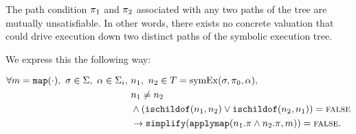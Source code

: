\begin{property}
  \label{prop:kingunique}
The path condition $\pi_1$ and $\pi_2$ associated with any two paths of the
tree are mutually unsatisfiable. In other words, there exists no concrete
valuation that could drive execution down two distinct paths of the symbolic
execution tree.

We express this the following way: 

\begin{align*}
\forall m = \mathtt{map(\cdot)},~\sigma \in \Sigma,~\alpha \in
\Sigma_i,~& n_1,~ n_2 \in T =
\mathrm{symEx}(\sigma,\pi_0,\alpha), \\
& n_1 \neq n_2 \\
&  \wedge
(\mathtt{ischildof}(n_1, n_2) \vee  \mathtt{ischildof}(n_2, n_1))= \mathtt{\textsc{false}} \\
&\rightarrow \mathtt{simplify}(\mathtt{applymap}(n_1.\pi \wedge n_2.\pi,m)) = \mathtt{\textsc{false}}.
\end{align*}

\end{property}

